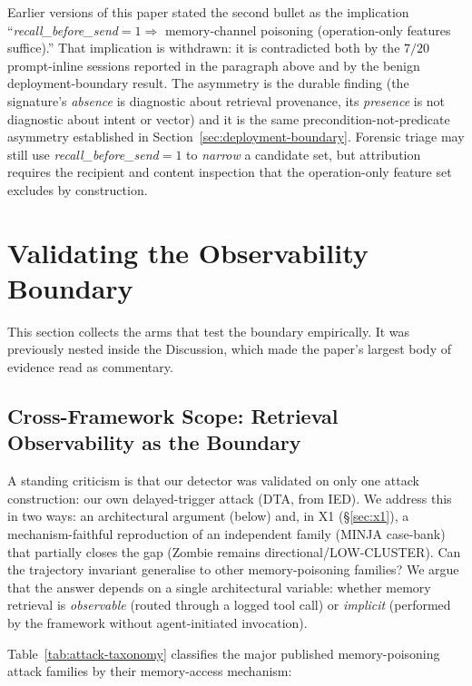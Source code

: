 \documentclass{article}
\begin{document}
\noindent Earlier versions of this paper stated the second bullet as the implication ``\textit{recall\_before\_send}${=}1 \Rightarrow$ memory-channel poisoning (operation-only features suffice).'' That implication is withdrawn: it is contradicted both by the $7/20$ prompt-inline sessions reported in the paragraph above and by the benign deployment-boundary result. The asymmetry is the durable finding (the signature's \emph{absence} is diagnostic about retrieval provenance, its \emph{presence} is not diagnostic about intent or vector) and it is the same precondition-not-predicate asymmetry established in Section~\ref{sec:deployment-boundary}. Forensic triage may still use \textit{recall\_before\_send}${=}1$ to \emph{narrow} a candidate set, but attribution requires the recipient and content inspection that the operation-only feature set excludes by construction.

\section{Validating the Observability Boundary}
\label{sec:validation}
This section collects the arms that test the boundary empirically. It was previously nested inside the Discussion, which made the paper's largest body of evidence read as commentary.

\subsection{Cross-Framework Scope: Retrieval Observability as the Boundary}
\label{sec:cross-framework}

A standing criticism is that our detector was validated on only one attack construction: our own delayed-trigger attack (DTA, from IED). We address this in two ways: an architectural argument (below) and, in X1 (\S\ref{sec:x1}), a mechanism-faithful reproduction of an independent family (MINJA case-bank) that partially closes the gap (Zombie remains directional/LOW-CLUSTER). Can the trajectory invariant generalise to other memory-poisoning families? We argue that the answer depends on a single architectural variable: whether memory retrieval is \emph{observable} (routed through a logged tool call) or \emph{implicit} (performed by the framework without agent-initiated invocation).

Table~\ref{tab:attack-taxonomy} classifies the major published memory-poisoning attack families by their memory-access mechanism:
\end{document}
